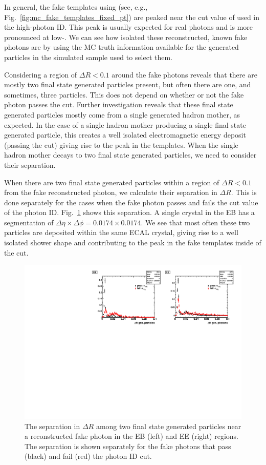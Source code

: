 In general, the fake templates using \sieie (see, e.g., Fig.~\ref{fig:mc_fake_templates_fixed_pt}) are peaked near the cut value of \sieie used in the high-\pt photon ID. This peak is usually expected for real photons and is more pronounced at low-\pt. We can see how isolated these reconstructed, known fake photons are by using the MC truth information available for the generated particles in the simulated sample used to select them.

Considering a region of $\Delta R < 0.1$ around the fake photons reveals that there are mostly two final state generated particles present, but often there are one, and sometimes, three particles. This does not depend on whether or not the fake photon passes the \sieie cut. Further investigation reveals that these final state generated particles mostly come from a single generated hadron mother, as expected. In the case of a single hadron mother producing a single final state generated particle, this creates a well isolated electromagnetic energy deposit (passing the \sieie cut) giving rise to the peak in the templates. When the single hadron mother decays to two final state generated particles, we need to consider their separation.

When there are two final state generated particles within a region of $\Delta R < 0.1$ from the fake reconstructed photon, we calculate their separation in $\Delta R$. This is done separately for the cases when the fake photon passes and fails the \sieie cut value of the photon ID. Fig.~\ref{fig:dR_study} shows this separation. A single crystal in the EB has a segmentation of $\Delta\eta{\times}\Delta\phi = 0.0174{\times}0.0174$. We see that most often these two particles are deposited within the same ECAL crystal, giving rise to a well isolated \sieie shower shape and contributing to the peak in the fake templates inside of the \sieie cut.

\begin{figure}[!htbp]
  \centering
  \includegraphics[scale=0.80]{figures/dR_cone_study_dR_two_particles.pdf}
  \caption{The separation in $\Delta R$ among two final state generated particles near a reconstructed fake photon in the EB (left) and EE (right) regions. The separation is shown separately for the fake photons that pass (black) and fail (red) the \sieie photon ID cut.}
  \label{fig:dR_study}
\end{figure}


